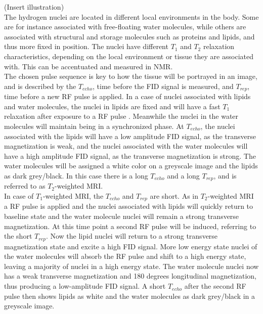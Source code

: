 {\Large (Insert illustration)} \\
The hydrogen nuclei are located in different local environments in the body. Some are for instance associated with free-floating water molecules, while others are associated with structural and storage molecules such as proteins and lipids, and thus more fixed in position. The nuclei have different $T_1$ and $T_2$ relaxation characteristics, depending on the local environment or tissue they are associated with. This can be accentuated and measured in NMR. \cite{Bharath2008} \\
The chosen pulse sequence is key to how the tissue will be portrayed in an image, and is described by the $T_{echo}$, time before the FID signal is measured, and $T_{rep}$, time before a new RF pulse is applied. In a case of nuclei associated with lipids and water molecules, the nuclei in lipids are fixed and will have a fast $T_1$ relaxation after exposure to a RF pulse . Meanwhile the nuclei in the water molecules will maintain being in a synchronized phase. At $T_{echo}$, the nuclei associated with the lipids will have a low amplitude FID signal, as the transverse magnetization is weak, and the nuclei associated with the water molecules will have a high amplitude FID signal, as the transverse magnetization is strong. The water molecules will be assigned a white color on a greyscale image and the lipids as dark grey/black. In this case there is a long $T_{echo}$ and a long $T_{rep}$, and is referred to as $T_2$-weighted MRI. \cite{Bharath2008} \\
In case of $T_1$-weighted MRI, the $T_{echo}$ and $T_{rep}$ are short. As in $T_2$-weighted MRI a RF pulse is applied and the nuclei associated with lipids will quickly return to baseline state and the water molecule nuclei will remain a strong transverse magnetization. At this time point a second RF pulse will be induced, referring to the short $T_{rep}$. Now the lipid nuclei will return to a strong transverse magnetization state and excite a high FID signal. More low energy state nuclei of the water molecules will absorb the RF pulse and shift to a high energy state, leaving a majority of nuclei in a high energy state. The water molecule nuclei now has a weak transverse magnetization and 180 degrees longitudinal magnetization, thus producing a low-amplitude FID signal. A short $T_{echo}$ after the second RF pulse then shows lipids as white and the water molecules as dark grey/black in a greyscale image. \cite{Bharath2008} 

